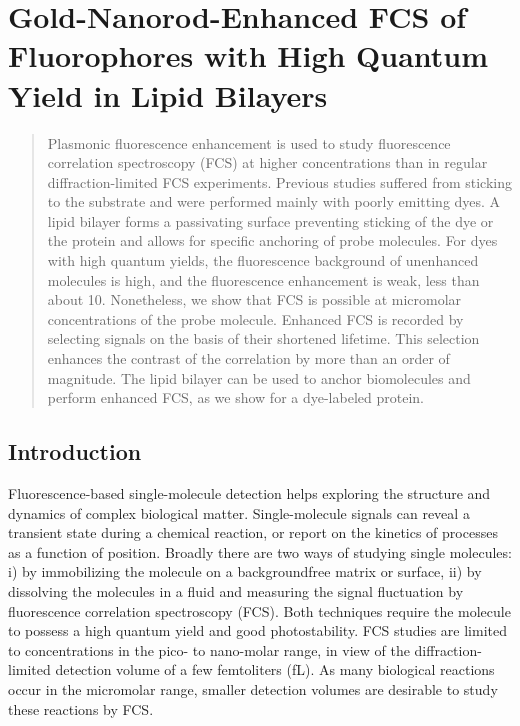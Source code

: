 \chapter{Gold-Nanorod-Enhanced FCS of Fluorophores with High Quantum Yield in Lipid Bilayers}
\label{chapter:EFCS}

\graphicspath{{chapters/c2_bilayer_efcs/figure/}}
\begin{abstract}
	Plasmonic fluorescence enhancement is used to study fluorescence correlation spectroscopy (FCS) at higher concentrations than in regular diffraction-limited FCS experiments. Previous studies suffered from sticking to the substrate and were performed mainly with poorly emitting dyes. A lipid bilayer forms a passivating surface preventing sticking of the dye or the protein and allows for specific anchoring of probe molecules. For dyes with high quantum yields, the fluorescence background of unenhanced molecules is high, and the fluorescence enhancement is weak, less than about 10. Nonetheless, we show that FCS is possible at micromolar concentrations of the probe molecule. Enhanced FCS is recorded by selecting signals on the basis of their shortened lifetime. This selection enhances the contrast of the correlation by more than an order of magnitude. The lipid bilayer can be used to anchor biomolecules and perform enhanced FCS, as we show for a dye-labeled protein.
\end{abstract}
\pagebreak
\section{Introduction}
Fluorescence-based single-molecule detection helps exploring the structure and dynamics of complex biological matter.\cite{moerner1999illuminating,weiss1999fluorescence} Single-molecule signals can reveal a transient state during a chemical reaction, or report on the kinetics of processes as a function of position. Broadly there are two ways of studying single molecules: i) by immobilizing the molecule on a backgroundfree matrix or surface, ii) by dissolving the molecules in a fluid and measuring the signal fluctuation by fluorescence correlation spectroscopy (FCS).\cite{Magde1972} Both techniques require the molecule to possess a high quantum yield and good photostability. FCS studies are limited to concentrations in the pico- to nano-molar range, in view of the diffraction-limited detection volume of a few femtoliters (fL). As many biological reactions occur in the micromolar range\cite{craighead2006future}, smaller detection volumes are desirable to study these reactions by FCS.\\


